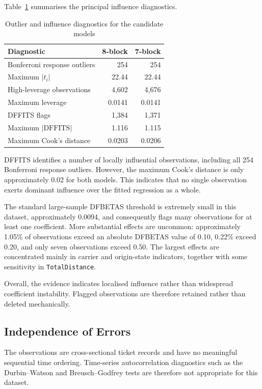 \documentclass[11pt,a4paper]{article}
\begin{document}
Table~\ref{tab:influence-summary} summarises the principal influence diagnostics.

\begin{table}[H]
\centering
\caption{Outlier and influence diagnostics for the candidate models}
\label{tab:influence-summary}
\begin{tabular}{lrr}
\toprule
\textbf{Diagnostic} & \textbf{8-block} & \textbf{7-block} \\
\midrule
Bonferroni response outliers & 254 & 254 \\
Maximum $|t_i|$ & 22.44 & 22.44 \\
High-leverage observations & 4,602 & 4,676 \\
Maximum leverage & 0.0141 & 0.0141 \\
DFFITS flags & 1,384 & 1,371 \\
Maximum $|\mathrm{DFFITS}|$ & 1.116 & 1.115 \\
Maximum Cook's distance & 0.0203 & 0.0206 \\
\bottomrule
\end{tabular}
\end{table}

DFFITS identifies a number of locally influential observations, including all 254 Bonferroni response outliers. However, the maximum Cook's distance is only approximately 0.02 for both models. This indicates that no single observation exerts dominant influence over the fitted regression as a whole.

The standard large-sample DFBETAS threshold is extremely small in this dataset, approximately 0.0094, and consequently flags many observations for at least one coefficient. More substantial effects are uncommon: approximately 1.05\% of observations exceed an absolute DFBETAS value of 0.10, 0.22\% exceed 0.20, and only seven observations exceed 0.50. The largest effects are concentrated mainly in carrier and origin-state indicators, together with some sensitivity in \texttt{TotalDistance}.

Overall, the evidence indicates localised influence rather than widespread coefficient instability. Flagged observations are therefore retained rather than deleted mechanically.

\subsection{Independence of Errors}

The observations are cross-sectional ticket records and have no meaningful sequential time ordering. Time-series autocorrelation diagnostics such as the Durbin--Watson and Breusch--Godfrey tests are therefore not appropriate for this dataset.
\end{document}
